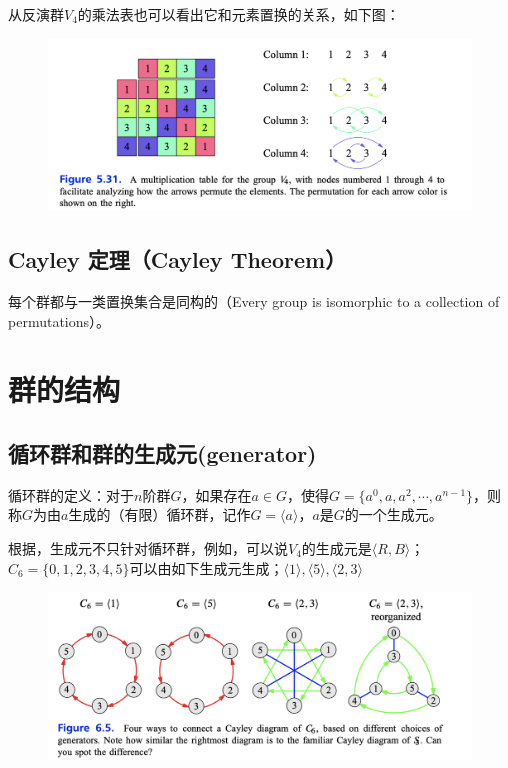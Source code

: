 \documentclass[12pt]{article}
\begin{document}
从反演群$V_4$的乘法表也可以看出它和元素置换的关系，如下图：
\begin{figure}[H]
    \centering
    \includegraphics[width=1\textwidth]{fig/Group/Multiplication-Permutation-V4.png}
\end{figure}

\subsection{Cayley 定理（Cayley Theorem）}
每个群都与一类置换集合是同构的（Every group is isomorphic to a collection of permutations）。

\section{群的结构}
\subsection{循环群和群的生成元(generator)}
\begin{mdframed}[
linecolor=black!40,outerlinewidth=1pt,roundcorner=.5em,innertopmargin=1ex,innerbottommargin=.5\baselineskip,innerrightmargin=1em,innerleftmargin=1em,backgroundcolor=gray!5,
]
循环群的定义：对于$n$阶群$G$，如果存在$a \in G$，使得$G = \{a^0, a, a^2, \cdots, a^{n-1}\}$，则称$G$为由$a$生成的（有限）循环群，记作$G = \langle a \rangle$，$a$是$G$的一个生成元{\cite{From_Linear_Equation_To_Galois_Theory}}。
\end{mdframed}
根据\cite{Visual_Group_Theory}，生成元不只针对循环群，例如，可以说$V_4$的生成元是$\langle R, B \rangle$；$C_6 = \{0, 1, 2, 3, 4, 5\}$可以由如下生成元生成；$\langle 1 \rangle, \langle 5 \rangle, \langle 2, 3 \rangle$
\begin{figure}[H]
    \centering
    \includegraphics[width=1\textwidth]{fig/Group/Cayley-C6-Generators.png}
\end{figure}
\end{document}

